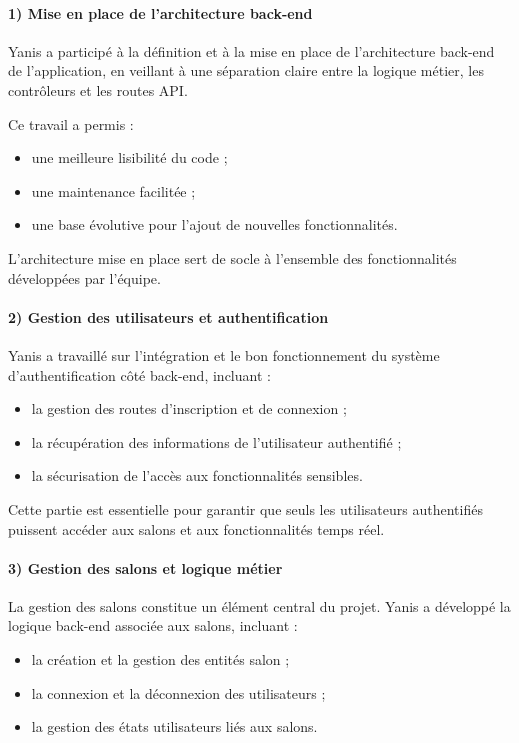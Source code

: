 \documentclass[12pt,a4paper]{report}
\begin{document}
\paragraph{1) Mise en place de l’architecture back-end}
Yanis a participé à la définition et à la mise en place de l’architecture back-end de l’application, en veillant à une séparation claire entre la logique métier, les contrôleurs et les routes API.

Ce travail a permis :
\begin{itemize}
  \item une meilleure lisibilité du code ;
  \item une maintenance facilitée ;
  \item une base évolutive pour l’ajout de nouvelles fonctionnalités.
\end{itemize}

L’architecture mise en place sert de socle à l’ensemble des fonctionnalités développées par l’équipe.

\paragraph{2) Gestion des utilisateurs et authentification}
Yanis a travaillé sur l’intégration et le bon fonctionnement du système d’authentification côté back-end, incluant :
\begin{itemize}
  \item la gestion des routes d’inscription et de connexion ;
  \item la récupération des informations de l’utilisateur authentifié ;
  \item la sécurisation de l’accès aux fonctionnalités sensibles.
\end{itemize}

Cette partie est essentielle pour garantir que seuls les utilisateurs authentifiés puissent accéder aux salons et aux fonctionnalités temps réel.

\paragraph{3) Gestion des salons et logique métier}
La gestion des salons constitue un élément central du projet. Yanis a développé la logique back-end associée aux salons, incluant :
\begin{itemize}
  \item la création et la gestion des entités salon ;
  \item la connexion et la déconnexion des utilisateurs ;
  \item la gestion des états utilisateurs liés aux salons.
\end{itemize}
\end{document}
